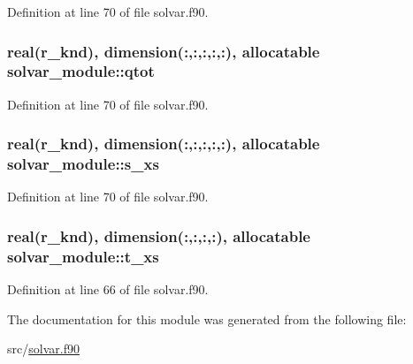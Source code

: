 Definition at line 70 of file solvar.\-f90.

\hypertarget{classsolvar__module_aea3d3733a1576348496e9e070924ad62}{
\subsubsection[{qtot}]{\setlength{\rightskip}{0pt plus 5cm}real(r\-\_\-knd), dimension(\-:,\-:,\-:,\-:,\-:), allocatable solvar\-\_\-module\-::qtot}}\label{classsolvar__module_aea3d3733a1576348496e9e070924ad62}


Definition at line 70 of file solvar.\-f90.

\hypertarget{classsolvar__module_ab36a684b0d77a635a3eb402da029b7b7}{
\subsubsection[{s\-\_\-xs}]{\setlength{\rightskip}{0pt plus 5cm}real(r\-\_\-knd), dimension(\-:,\-:,\-:,\-:,\-:), allocatable solvar\-\_\-module\-::s\-\_\-xs}}\label{classsolvar__module_ab36a684b0d77a635a3eb402da029b7b7}


Definition at line 70 of file solvar.\-f90.

\hypertarget{classsolvar__module_ad35df9ae79e394c41cd47d92a0f26da7}{
\subsubsection[{t\-\_\-xs}]{\setlength{\rightskip}{0pt plus 5cm}real(r\-\_\-knd), dimension(\-:,\-:,\-:,\-:), allocatable solvar\-\_\-module\-::t\-\_\-xs}}\label{classsolvar__module_ad35df9ae79e394c41cd47d92a0f26da7}


Definition at line 66 of file solvar.\-f90.



The documentation for this module was generated from the following file\-:\begin{DoxyCompactItemize}
\item 
src/\hyperlink{solvar_8f90}{solvar.\-f90}\end{DoxyCompactItemize}
